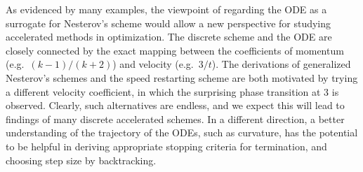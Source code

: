\documentclass[twoside,11pt]{article}
\begin{document}
As evidenced by many examples, the viewpoint of regarding the ODE as a surrogate for Nesterov's scheme would allow a new perspective for studying accelerated methods in optimization. The discrete scheme and the ODE are closely connected by the exact mapping between the coefficients of momentum (e.g.~$(k-1)/(k+2)$) and velocity (e.g.~$3/t$). The derivations of generalized Nesterov's schemes and the speed restarting scheme are both motivated by trying a different velocity coefficient, in which the surprising phase transition at 3 is observed. Clearly, such alternatives are endless, and we expect this will lead to findings of many discrete accelerated schemes. In a different direction, a better understanding of the trajectory of the ODEs, such as curvature, has the potential to be helpful in deriving appropriate stopping criteria for termination, and choosing step size by backtracking.






\appendix
\end{document}

